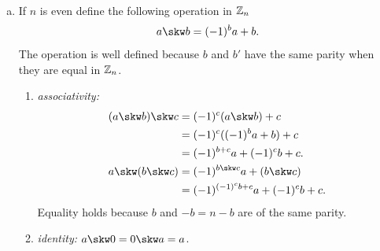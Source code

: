 \begin{xmpls}\label{xmpls:SLB}${}$
\begin{enumerate}[a),font=\upshape]
    \item If $n$ is even define the following operation in $\mathbb{Z}_n$
    $$
        a\skw b = (-1)^ba + b.
    $$
    The operation is well defined because $b$ and $b'$ have the same parity when they are equal in $\mathbb{Z}_n$.
    \begin{enumerate}[-]
        \item \textit{associativity:}
            \begin{align*}
                (a\skw b)\skw c &= (-1)^c(a\skw b)+c\\
                    &= (-1)^c((-1)^ba+b)+c\\
                    &= (-1)^{b+c}a + (-1)^cb + c.\\
                a\skw(b\skw c) &= (-1)^{b\skw c}a+(b\skw c)\\
                    &= (-1)^{(-1)^cb+c}a + (-1)^cb+c.
            \end{align*}
            Equality holds because $b$ and $-b=n-b$ are of the same parity.
        \item \textit{identity:} $a\skw0=0\skw a=a$.


\end{enumerate}
\end{enumerate}
\end{xmpls}
